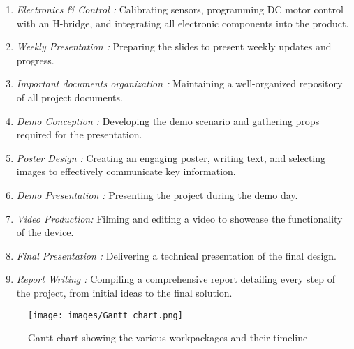 \documentclass[lettersize,journal]{IEEEtran}
\begin{document}
\begin{enumerate}
    \item \textit{Electronics \& Control :} Calibrating sensors, programming DC motor control with an H-bridge, and integrating all electronic components into the product.

    \item \textit{Weekly Presentation :} Preparing the slides to present weekly updates and progress.

    \item \textit{Important documents organization :} Maintaining a well-organized repository of all project documents.

    \item \textit{Demo Conception :} Developing the demo scenario and gathering props required for the presentation.

    \item \textit{Poster Design :} Creating an engaging poster, writing text, and selecting images to effectively communicate key information.

    \item \textit{Demo Presentation :} Presenting the project during the demo day.

    \item \textit{Video Production:} Filming and editing a video to showcase the functionality of the device. 

    \item \textit{Final Presentation :} Delivering a technical presentation of the final design.

    \item \textit{Report Writing :} Compiling a comprehensive report detailing every step of the project, from initial ideas to the final solution.
    
\end{enumerate}


\begin{figure}[ht]
\centering
\texttt{[image: images/Gantt\_chart.png]}
\caption{Gantt chart showing the various workpackages and their timeline}
\label{gantt}
\end{figure}

\end{document}
